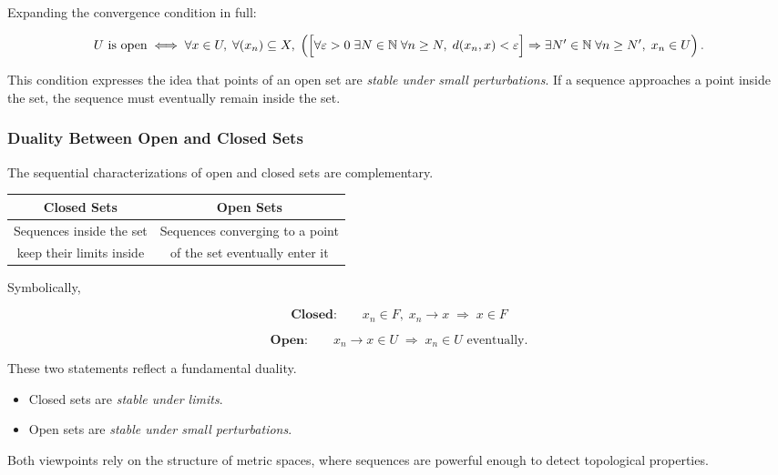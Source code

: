 Expanding the convergence condition in full:

\[
U \text{ is open}
\iff
\forall x\in U,\;
\forall (x_n)\subseteq X,\;
\left(
  \Bigl[
    \forall \varepsilon>0\;
    \exists N\in\mathbb{N}\;
    \forall n\ge N,\;
    d(x_n,x)<\varepsilon
  \Bigr]
  \Rightarrow
  \exists N'\in\mathbb{N}\;
  \forall n\ge N',\;
  x_n\in U
\right).
\]

\begin{remark*}
This condition expresses the idea that points of an open set
are \emph{stable under small perturbations}.
If a sequence approaches a point inside the set, the sequence
must eventually remain inside the set.
\end{remark*}

\subsubsection{Duality Between Open and Closed Sets}

The sequential characterizations of open and closed sets
are complementary.

\begin{center}
\begin{tabular}{cc}
\toprule
\textbf{Closed Sets} & \textbf{Open Sets} \\
\midrule
Sequences inside the set & Sequences converging to a point \\
keep their limits inside & of the set eventually enter it \\
\bottomrule
\end{tabular}
\end{center}

\noindent Symbolically,

\[
\textbf{Closed:}
\qquad
x_n \in F,\; x_n \to x
\;\Rightarrow\;
x\in F
\]

\[
\textbf{Open:}
\qquad
x_n \to x \in U
\;\Rightarrow\;
x_n \in U
\text{ eventually.}
\]

\begin{remark*}
These two statements reflect a fundamental duality.
\begin{itemize}
\item Closed sets are \emph{stable under limits}.
\item Open sets are \emph{stable under small perturbations}.
\end{itemize}
Both viewpoints rely on the structure of metric spaces,
where sequences are powerful enough to detect topological properties.
\end{remark*}

